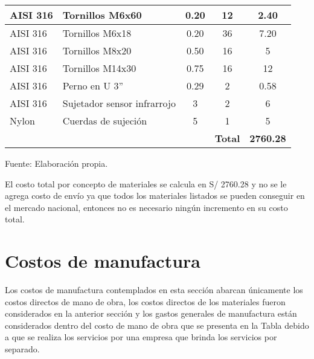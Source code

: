 \begin{table}[H]
\begin{tabular}{llc|c|c|}
		\multicolumn{1}{|l|}{AISI 316} & \multicolumn{1}{l|}{Tornillos M6x60} & 0.20 & 12 & 2.40 \\ \hline
		\multicolumn{1}{|l|}{AISI 316} & \multicolumn{1}{l|}{Tornillos M6x18} & 0.20 & 36 & 7.20 \\ \hline
		\multicolumn{1}{|l|}{AISI 316} & \multicolumn{1}{l|}{Tornillos M8x20} & 0.50 & 16 & 5 \\ \hline
		\multicolumn{1}{|l|}{AISI 316} & \multicolumn{1}{l|}{Tornillos M14x30} & 0.75 & 16 & 12 \\ \hline
		\multicolumn{1}{|l|}{AISI 316} & \multicolumn{1}{l|}{Perno en U 3''} & 0.29 & 2 & 0.58 \\ \hline
		\multicolumn{1}{|l|}{AISI 316} & \multicolumn{1}{l|}{Sujetador sensor infrarrojo} & 3 & 2 & 6 \\ \hline
		\multicolumn{1}{|l|}{Nylon} & \multicolumn{1}{l|}{Cuerdas de sujeción} & 5 & 1 & 5 \\ \hline		
		&  &  & \textbf{Total} & \textbf{2760.28} \\ \cline{4-5} 
	\end{tabular}
	\begin{myflushcenteraftertable}	
		Fuente: Elaboración propia.
	\end{myflushcenteraftertable}
\end{table}

El costo total por concepto de materiales se calcula en S/ 2760.28 y no se le agrega costo de envío ya que todos los materiales listados se pueden conseguir en el mercado nacional, entonces no es necesario ningún incremento en su costo total.

\section{Costos de manufactura}

Los costos de manufactura contemplados en esta sección abarcan únicamente los costos directos de mano de obra, los costos directos de los materiales fueron considerados en la anterior sección y los gastos generales de manufactura están considerados dentro del costo de mano de obra que se presenta en la Tabla debido a que se realiza los servicios por una empresa que brinda los servicios por separado.

